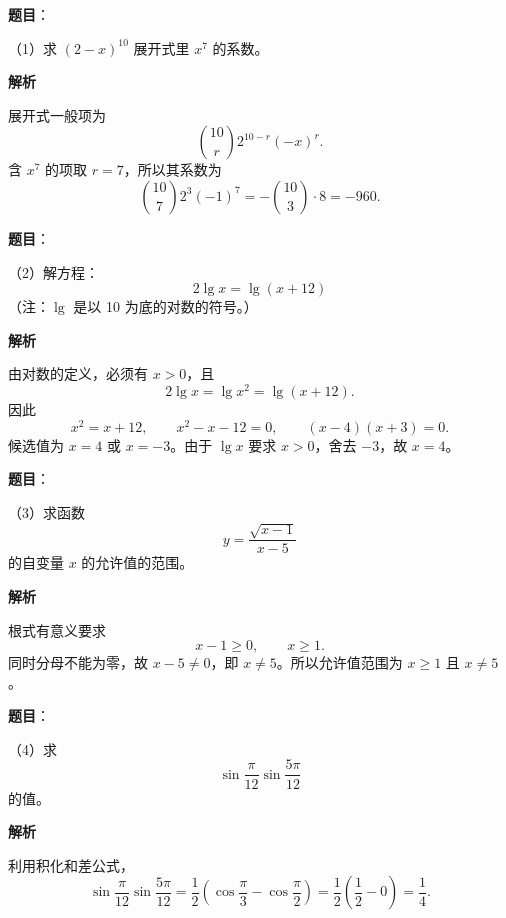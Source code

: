 


\begin{answer}

\textbf{题目}：

（1）求 $(2-x)^{10}$ 展开式里 $x^7$ 的系数。

\textbf{解析}

展开式一般项为
\[
\binom{10}{r}2^{10-r}(-x)^r.
\]
含 $x^7$ 的项取 $r=7$，所以其系数为
\[
\binom{10}{7}2^3(-1)^7
=-\binom{10}{3}\cdot8
=-960.
\]


\end{answer}
\begin{answer}

\textbf{题目}：

（2）解方程：
\[
2\lg x=\lg(x+12)
\]
（注：$\lg$ 是以 10 为底的对数的符号。）

\textbf{解析}

由对数的定义，必须有 $x>0$，且
\[
2\lg x=\lg x^2=\lg(x+12).
\]
因此
\[
x^2=x+12,
\qquad x^2-x-12=0,
\qquad (x-4)(x+3)=0.
\]
候选值为 $x=4$ 或 $x=-3$。由于 $\lg x$ 要求 $x>0$，舍去 $-3$，故 $x=4$。


\end{answer}
\begin{answer}

\textbf{题目}：

（3）求函数
\[
y=\frac{\sqrt{x-1}}{x-5}
\]
的自变量 $x$ 的允许值的范围。

\textbf{解析}

根式有意义要求
\[
x-1\ge0,
\qquad x\ge1.
\]
同时分母不能为零，故 $x-5\ne0$，即 $x\ne5$。所以允许值范围为 $x\ge1$ 且 $x\ne5$。


\end{answer}
\begin{answer}

\textbf{题目}：

（4）求
\[
\sin\frac{\pi}{12}\sin\frac{5\pi}{12}
\]
的值。

\textbf{解析}

利用积化和差公式，
\[
\sin\frac\pi{12}\sin\frac{5\pi}{12}
=\frac12\left(\cos\frac\pi3-\cos\frac\pi2\right)
=\frac12\left(\frac12-0\right)=\frac14.
\]


\end{answer}
